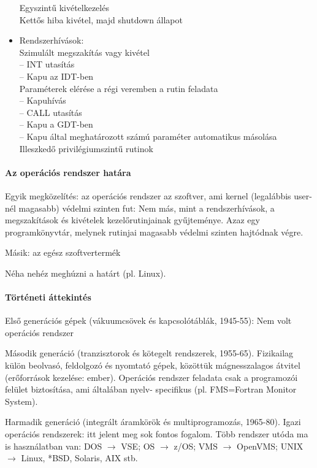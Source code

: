 \documentclass[fleqn,10pt,a4paper]{article}
\theoremstyle{magyar}
\begin{document}
\begin{itemize}
    Egyszintű kivételkezelés\\
    Kettős hiba kivétel, majd shutdown állapot
  \item Rendszerhívások:\\
    Szimulált megszakítás vagy kivétel\\
    -- INT utasítás\\
    -- Kapu az IDT-ben\\
    Paraméterek elérése a régi veremben a rutin feladata\\
    -- Kapuhívás\\
    -- CALL utasítás\\
    -- Kapu a GDT-ben\\
    -- Kapu által meghatározott számú paraméter automatikus másolása\\
    Illeszkedő privilégiumszintű rutinok
  \end{itemize}
  

  \paragraph{Az operációs rendszer határa}  Egyik megközelítés: az operációs rendszer az szoftver, ami kernel
  (legalábbis user-nél magasabb) védelmi szinten fut: Nem más, mint a rendszerhívások, a megszakítások és kivételek
  kezelőrutinjainak gyűjteménye. Azaz egy programkönyvtár, melynek rutinjai magasabb védelmi szinten hajtódnak végre.
  
  Másik: az egész szoftvertermék  
  
  Néha nehéz meghúzni a határt (pl. Linux).
  
  \paragraph{Történeti áttekintés}  Első generációs gépek (vákuumcsövek és kapcsolótáblák, 1945-55): Nem volt operációs
  rendszer
 
  Második generáció (tranzisztorok és kötegelt rendszerek, 1955-65). Fizikailag külön beolvasó, feldolgozó és nyomtató
  gépek, közöttük mágnesszalagos átvitel (erőforrások kezelése: ember). Operációs rendszer feladata csak a programozói
  felület biztosítása, ami általában nyelv- specifikus (pl. FMS=Fortran Monitor System).

  Harmadik generáció (integrált áramkörök és multiprogramozás, 1965-80). Igazi operációs rendszerek: itt jelent meg sok
  fontos fogalom. Több rendszer utóda ma is használatban van: DOS $\to$ VSE; OS $\to$ z/OS; VMS $\to$ OpenVMS; UNIX $\to$
  Linux, *BSD,  Solaris, AIX stb.
\end{document}
